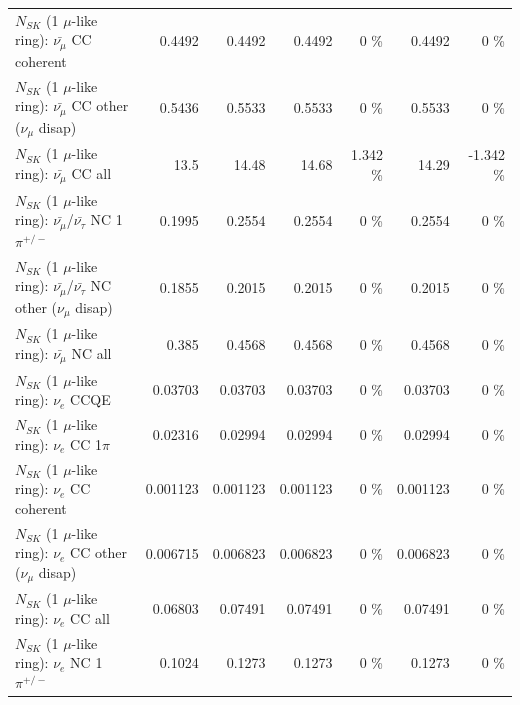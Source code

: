 \begin{table}
\begin{tabular}{| l | r | r | r  r | r  r |}
                       $N_{SK}$ (1 $\mu$-like ring): $\bar{\nu_\mu}$ CC coherent &          0.4492 &          0.4492 &          0.4492 &        0 \%  &          0.4492 &        0 \%  \\ 
        $N_{SK}$ (1 $\mu$-like ring): $\bar{\nu_\mu}$ CC other ($\nu_\mu$ disap) &          0.5436 &          0.5533 &          0.5533 &        0 \%  &          0.5533 &        0 \%  \\ 
                          $N_{SK}$ (1 $\mu$-like ring): $\bar{\nu_{\mu}}$ CC all &            13.5 &           14.48 &           14.68 &    1.342 \%  &           14.29 &   -1.342 \%  \\ 
\hline
  $N_{SK}$ (1 $\mu$-like ring): $\bar{\nu_\mu}$/$\bar{\nu_\tau}$ NC 1$\pi^{+/-}$ &          0.1995 &          0.2554 &          0.2554 &        0 \%  &          0.2554 &        0 \%  \\ 
$N_{SK}$ (1 $\mu$-like ring): $\bar{\nu_\mu}$/$\bar{\nu_\tau}$ NC other ($\nu_\mu$ disap) &          0.1855 &          0.2015 &          0.2015 &        0 \%  &          0.2015 &        0 \%  \\ 
                          $N_{SK}$ (1 $\mu$-like ring): $\bar{\nu_{\mu}}$ NC all &           0.385 &          0.4568 &          0.4568 &        0 \%  &          0.4568 &        0 \%  \\ 
\hline
\hline
\hline
                                      $N_{SK}$ (1 $\mu$-like ring): $\nu_e$ CCQE &         0.03703 &         0.03703 &         0.03703 &        0 \%  &         0.03703 &        0 \%  \\ 
                                 $N_{SK}$ (1 $\mu$-like ring): $\nu_e$ CC 1$\pi$ &         0.02316 &         0.02994 &         0.02994 &        0 \%  &         0.02994 &        0 \%  \\ 
                               $N_{SK}$ (1 $\mu$-like ring): $\nu_e$ CC coherent &        0.001123 &        0.001123 &        0.001123 &        0 \%  &        0.001123 &        0 \%  \\ 
                $N_{SK}$ (1 $\mu$-like ring): $\nu_e$ CC other ($\nu_\mu$ disap) &        0.006715 &        0.006823 &        0.006823 &        0 \%  &        0.006823 &        0 \%  \\ 
                                  $N_{SK}$ (1 $\mu$-like ring): $\nu_{e}$ CC all &         0.06803 &         0.07491 &         0.07491 &        0 \%  &         0.07491 &        0 \%  \\ 
\hline
                           $N_{SK}$ (1 $\mu$-like ring): $\nu_e$ NC 1$\pi^{+/-}$ &          0.1024 &          0.1273 &          0.1273 &        0 \%  &          0.1273 &        0 \%  \\ 

\end{tabular}
\end{table}
